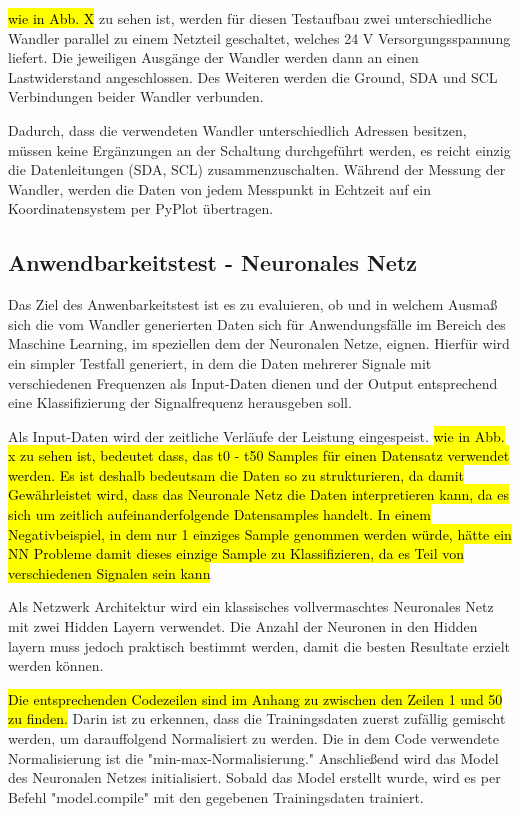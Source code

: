 \hl{wie in Abb. X} zu sehen ist, werden für diesen Testaufbau zwei unterschiedliche Wandler parallel zu einem Netzteil geschaltet, welches 24 V Versorgungsspannung liefert. Die jeweiligen Ausgänge der Wandler werden dann an einen Lastwiderstand angeschlossen. Des Weiteren werden die Ground, SDA und SCL Verbindungen beider Wandler verbunden.

Dadurch, dass die verwendeten Wandler unterschiedlich Adressen besitzen, müssen keine Ergänzungen an der Schaltung durchgeführt werden, es reicht einzig die Datenleitungen (SDA, SCL) zusammenzuschalten. Während der Messung der Wandler, werden die Daten von jedem Messpunkt in Echtzeit auf ein Koordinatensystem per PyPlot übertragen.

\subsection{Anwendbarkeitstest - Neuronales Netz}

Das Ziel des Anwenbarkeitstest ist es zu evaluieren, ob und in welchem Ausmaß sich die vom Wandler generierten Daten sich für Anwendungsfälle im Bereich des Maschine Learning, im speziellen dem der Neuronalen Netze, eignen. Hierfür wird ein simpler Testfall generiert, in dem die Daten mehrerer Signale mit verschiedenen Frequenzen als Input-Daten dienen und der Output entsprechend eine Klassifizierung der Signalfrequenz herausgeben soll.

Als Input-Daten wird der zeitliche Verläufe der Leistung eingespeist. \hl{wie in Abb. x zu sehen ist, bedeutet dass, das t0 - t50 Samples für einen Datensatz verwendet werden. Es ist deshalb bedeutsam die Daten so zu strukturieren, da damit Gewährleistet wird, dass das Neuronale Netz die Daten interpretieren kann, da es sich um zeitlich aufeinanderfolgende Datensamples handelt. In einem Negativbeispiel, in dem nur 1 einziges Sample genommen werden würde, hätte ein NN Probleme damit dieses einzige Sample zu Klassifizieren, da es Teil von verschiedenen Signalen sein kann}

Als Netzwerk Architektur wird ein klassisches vollvermaschtes Neuronales Netz mit zwei Hidden Layern verwendet. Die Anzahl der Neuronen in den Hidden layern muss jedoch praktisch bestimmt werden, damit die besten Resultate erzielt werden können.

\hl{Die entsprechenden Codezeilen sind im Anhang zu zwischen den Zeilen 1 und 50 zu finden.} Darin ist zu erkennen, dass die Trainingsdaten zuerst zufällig gemischt werden, um darauffolgend Normalisiert zu werden. Die in dem Code verwendete Normalisierung ist die "min-max-Normalisierung."  Anschließend wird das Model des Neuronalen Netzes initialisiert. Sobald das Model erstellt wurde, wird es per Befehl "model.compile" mit den gegebenen Trainingsdaten trainiert.


